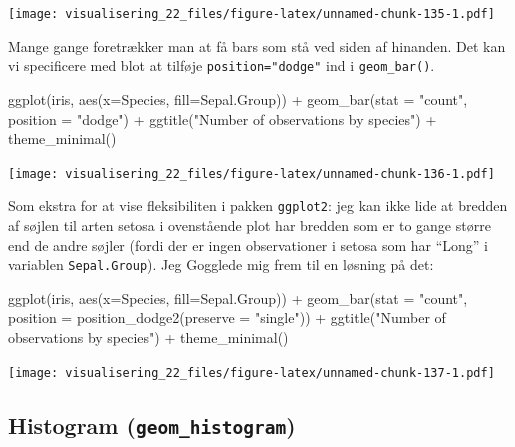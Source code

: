 \documentclass[
]{book}
\newenvironment{Shaded}{\begin{snugshade}}{\end{snugshade}}
\newcommand{\AttributeTok}[1]{\textcolor[rgb]{0.77,0.63,0.00}{#1}}
\newcommand{\FunctionTok}[1]{\textcolor[rgb]{0.00,0.00,0.00}{#1}}
\newcommand{\NormalTok}[1]{#1}
\newcommand{\SpecialCharTok}[1]{\textcolor[rgb]{0.00,0.00,0.00}{#1}}
\newcommand{\StringTok}[1]{\textcolor[rgb]{0.31,0.60,0.02}{#1}}
\begin{document}
\texttt{[image: visualisering\_22\_files/figure-latex/unnamed-chunk-135-1.pdf]}

Mange gange foretrækker man at få bars som stå ved siden af hinanden. Det kan vi specificere med blot at tilføje \texttt{position="dodge"} ind i \texttt{geom\_bar()}.

\begin{Shaded}
\begin{Highlighting}[]
\FunctionTok{ggplot}\NormalTok{(iris, }\FunctionTok{aes}\NormalTok{(}\AttributeTok{x=}\NormalTok{Species, }\AttributeTok{fill=}\NormalTok{Sepal.Group)) }\SpecialCharTok{+} 
  \FunctionTok{geom\_bar}\NormalTok{(}\AttributeTok{stat =} \StringTok{"count"}\NormalTok{, }\AttributeTok{position =} \StringTok{"dodge"}\NormalTok{) }\SpecialCharTok{+}
  \FunctionTok{ggtitle}\NormalTok{(}\StringTok{"Number of observations by species"}\NormalTok{) }\SpecialCharTok{+}
  \FunctionTok{theme\_minimal}\NormalTok{()}
\end{Highlighting}
\end{Shaded}

\texttt{[image: visualisering\_22\_files/figure-latex/unnamed-chunk-136-1.pdf]}

Som ekstra for at vise fleksibiliten i pakken \texttt{ggplot2}: jeg kan ikke lide at bredden af søjlen til arten setosa i ovenstående plot har bredden som er to gange større end de andre søjler (fordi der er ingen observationer i setosa som har ``Long'' i variablen \texttt{Sepal.Group}). Jeg Gogglede mig frem til en løsning på det:

\begin{Shaded}
\begin{Highlighting}[]
\FunctionTok{ggplot}\NormalTok{(iris, }\FunctionTok{aes}\NormalTok{(}\AttributeTok{x=}\NormalTok{Species, }\AttributeTok{fill=}\NormalTok{Sepal.Group)) }\SpecialCharTok{+} 
  \FunctionTok{geom\_bar}\NormalTok{(}\AttributeTok{stat =} \StringTok{"count"}\NormalTok{, }\AttributeTok{position =} \FunctionTok{position\_dodge2}\NormalTok{(}\AttributeTok{preserve =} \StringTok{"single"}\NormalTok{)) }\SpecialCharTok{+}
  \FunctionTok{ggtitle}\NormalTok{(}\StringTok{"Number of observations by species"}\NormalTok{) }\SpecialCharTok{+}
  \FunctionTok{theme\_minimal}\NormalTok{()}
\end{Highlighting}
\end{Shaded}

\texttt{[image: visualisering\_22\_files/figure-latex/unnamed-chunk-137-1.pdf]}

\hypertarget{histogram-geom_histogram}{%
\subsection{\texorpdfstring{Histogram (\texttt{geom\_histogram})}{Histogram (geom\_histogram)}}\label{histogram-geom_histogram}}
\end{document}
